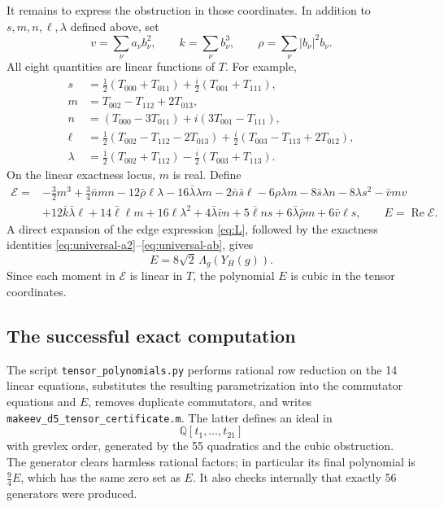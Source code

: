 \documentclass[11pt,reqno]{amsart}
\theoremstyle{remark}
\begin{document}
It remains to express the obstruction in those coordinates.  In addition to
$s,m,n,\ell,\lambda$ defined above, set
\[
 v=\sum_\nu a_\nu b_\nu^2,\qquad
 k=\sum_\nu b_\nu^3,\qquad
 \rho=\sum_\nu |b_\nu|^2b_\nu.
\]
All eight quantities are linear functions of $T$.  For example,
\begin{align*}
 s&=\tfrac12(T_{000}+T_{011})
       +\tfrac i2(T_{001}+T_{111}),\\
 m&=T_{002}-T_{112}+2T_{013},\\
 n&=(T_{000}-3T_{011})+i(3T_{001}-T_{111}),\\
 \ell&=\tfrac12(T_{002}-T_{112}-2T_{013})
       +\tfrac i2(T_{003}-T_{113}+2T_{012}),\\
 \lambda&=\tfrac12(T_{002}+T_{112})
       -\tfrac i2(T_{003}+T_{113}).
\end{align*}
On the linear exactness locus, $m$ is real.  Define
\begin{align*}
 \mathscr E={}&-\tfrac32m^3+\tfrac34\bar nmn
 -12\bar\rho\ell\lambda-16\bar\lambda\lambda m
 -2\bar n\bar s\ell-6\rho\lambda m
 -8\bar s\lambda n-8\lambda s^2-\bar v m v\\
 &+12\bar k\bar\lambda\ell+14\bar\ell\ell m
 +16\ell\lambda^2+4\bar\lambda\bar v n
 +5\bar\ell ns+6\bar\lambda\bar\rho m+6\bar v\ell s,
 \qquad E=\operatorname{Re}\mathscr E.
\end{align*}
A direct expansion of the edge expression \eqref{eq:L}, followed by the
exactness identities \eqref{eq:universal-a2}--\eqref{eq:universal-ab}, gives
\begin{equation}\label{eq:Escale}
 E=8\sqrt2\,\Lambda_g(Y_H(g)).
\end{equation}
Since each moment in $\mathscr E$ is linear in $T$, the polynomial $E$ is
cubic in the tensor coordinates.

\subsection{The successful exact computation}

The script \texttt{tensor\_polynomials.py} performs rational row reduction on
the 14 linear equations, substitutes the resulting parametrization into the
commutator equations and $E$, removes duplicate commutators, and writes
\texttt{makeev\_d5\_tensor\_certificate.m}.  The latter defines an ideal in
\[
 \mathbb Q[t_1,\ldots,t_{21}]
\]
with grevlex order, generated by the 55 quadratics and the cubic obstruction.
The generator clears harmless rational factors; in particular its final
polynomial is $\tfrac94E$, which has the same zero set as $E$.  It also checks
internally that exactly 56 generators were produced.
\end{document}
